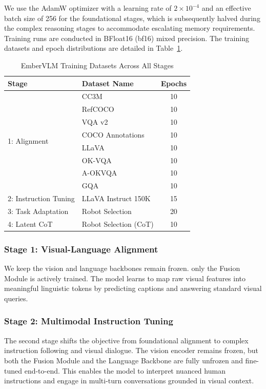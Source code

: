 \documentclass[runningheads]{llncs}
\begin{document}
We use the AdamW optimizer with a learning rate of $2 \times 10^{-4}$ and an effective batch size of 256 for the foundational stages, which is subsequently halved during the complex reasoning stages to accommodate escalating memory requirements. Training runs are conducted in BFloat16 (bf16) mixed precision. The training datasets and epoch distributions are detailed in Table~\ref{tab:all_training_datasets}.

\begin{table}[ht]
\centering
\caption{EmberVLM Training Datasets Across All Stages}
\label{tab:all_training_datasets}
\begin{tabular}{llc}
\toprule
\textbf{Stage} & \textbf{Dataset Name} & \textbf{Epochs} \\
\midrule
\multirow{8}{*}{1: Alignment} 
& CC3M \cite{sharma-etal-2018-conceptual} & 10 \\
& RefCOCO \cite{yu2016modelingcontextreferringexpressions} & 10 \\
& VQA v2 \cite{VQA} & 10 \\
& COCO Annotations \cite{lin2015microsoftcococommonobjects} & 10 \\
& LLaVA \cite{liu2023visualinstructiontuning} & 10 \\
& OK-VQA \cite{marino2019okvqavisualquestionanswering} & 10 \\
& A-OKVQA \cite{schwenk2022aokvqabenchmarkvisualquestion} & 10 \\
& GQA \cite{hudson2019gqanewdatasetrealworld} & 10 \\
\midrule
2: Instruction Tuning & LLaVA Instruct 150K & 15 \\
\midrule
3: Task Adaptation & Robot Selection & 20 \\
\midrule
4: Latent CoT & Robot Selection (CoT) & 10 \\
\bottomrule
\end{tabular}
\end{table}

\subsubsection{Stage 1: Visual-Language Alignment}
We keep the vision and language backbones remain frozen. only the Fusion Module is actively trained. The model learns to map raw visual features into meaningful linguistic tokens by predicting captions and answering standard visual queries.

\subsubsection{Stage 2: Multimodal Instruction Tuning}
The second stage shifts the objective from foundational alignment to complex instruction following and visual dialogue. The vision encoder remains frozen, but both the Fusion Module and the Language Backbone are fully unfrozen and fine-tuned end-to-end. This enables the model to interpret nuanced human instructions and engage in multi-turn conversations grounded in visual context.
\end{document}
